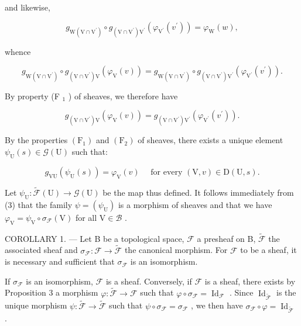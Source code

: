 and likewise,

\[
g _ {\mathrm{W} (\mathrm{V} \cap \mathrm{V} ^ {\prime})} \circ g _ {(\mathrm{V} \cap \mathrm{V} ^ {\prime}) \mathrm{V} ^ {\prime}} (\varphi_ {\mathrm{V} ^ {\prime}} (v ^ {\prime})) = \varphi_ {\mathrm{W}} (w),
\]

whence

\[
g _ {\mathrm{W} (\mathrm{V} \cap \mathrm{V} ^ {\prime})} \circ g _ {(\mathrm{V} \cap \mathrm{V} ^ {\prime}) \mathrm{V}} (\varphi_ {\mathrm{V}} (v)) = g _ {\mathrm{W} (\mathrm{V} \cap \mathrm{V} ^ {\prime})} \circ g _ {(\mathrm{V} \cap \mathrm{V} ^ {\prime}) \mathrm{V} ^ {\prime}} (\varphi_ {\mathrm{V} ^ {\prime}} (v ^ {\prime})).
\]

By property (F \(_{1}\) ) of sheaves, we therefore have

\[
g _ {(\mathrm{V} \cap \mathrm{V} ^ {\prime}) \mathrm{V}} (\varphi_ {\mathrm{V}} (v)) = g _ {(\mathrm{V} \cap \mathrm{V} ^ {\prime}) \mathrm{V} ^ {\prime}} (\varphi_ {\mathrm{V} ^ {\prime}} (v ^ {\prime})).
\]

By the properties \((\mathrm{F}_{1})\) and \((\mathrm{F}_{2})\) of sheaves, there exists a unique element \(\psi_{\mathrm{U}}(s) \in \mathcal{G}(\mathrm{U})\) such that:

\[
g _ {\mathrm{VU}} \left(\psi_ {\mathrm{U}} (s)\right) = \varphi_ {\mathrm{V}} (v) \quad \text {   for   every   } (\mathrm{V}, v) \in \mathrm{D} (\mathrm{U}, s).\tag{3}
\]

Let \(\psi_{\mathrm{U}}\colon \widetilde{\mathcal{F}} (\mathrm{U})\to \mathcal{G}(\mathrm{U})\) be the map thus defined. It follows immediately from (3) that the family \(\psi = (\psi_{\mathrm{U}})\) is a morphism of sheaves and that we have \(\varphi_{\mathrm{V}} = \psi_{\mathrm{V}}\circ \sigma_{\mathcal{F}}(\mathrm{V})\) for all \(\mathrm{V}\in \mathcal{B}\) .

COROLLARY 1. --- Let B be a topological space, \(\mathcal{F}\) a presheaf on B, \(\widetilde{\mathcal{F}}\) the associated sheaf and \(\sigma_{\mathcal{F}}\colon \mathcal{F} \to \widetilde{\mathcal{F}}\) the canonical morphism. For \(\mathcal{F}\) to be a sheaf, it is necessary and sufficient that \(\sigma_{\mathcal{F}}\) is an isomorphism.

If \(\sigma_{\mathcal{F}}\) is an isomorphism, \(\mathcal{F}\) is a sheaf. Conversely, if \(\mathcal{F}\) is a sheaf, there exists by Proposition 3 a morphism \(\varphi: \widetilde{\mathcal{F}} \to \mathcal{F}\) such that \(\varphi \circ \sigma_{\mathcal{F}} = \operatorname{Id}_{\mathcal{F}}\) . Since \(\operatorname{Id}_{\widetilde{\mathcal{F}}}\) is the unique morphism \(\psi: \widetilde{\mathcal{F}} \to \widetilde{\mathcal{F}}\) such that \(\psi \circ \sigma_{\mathcal{F}} = \sigma_{\mathcal{F}}\) , we then have \(\sigma_{\mathcal{F}} \circ \varphi = \operatorname{Id}_{\widetilde{\mathcal{F}}}\) .

